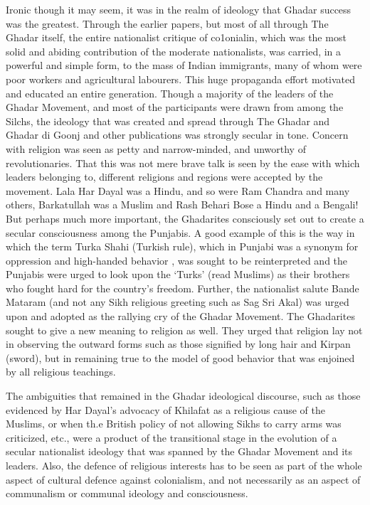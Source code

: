 Ironic though it may seem, it was in the realm of ideology that Ghadar success was the greatest. Through the earlier papers, but most of all through The Ghadar itself, the entire nationalist critique of co1onialin, which was the most solid and abiding contribution of the moderate nationalists, was carried, in a powerful and simple form, to the mass of Indian immigrants, many of whom were poor workers and agricultural labourers. This huge propaganda effort motivated and educated an entire generation. Though a majority of the leaders of the Ghadar Movement, and most of the participants were drawn from among the Silchs, the ideology that was created and spread through The Ghadar and Ghadar di Goonj and other publications was strongly secular in tone. Concern with religion was seen as petty and narrow-minded, and unworthy of revolutionaries. That this was not mere brave talk is seen by the ease with which leaders belonging to, different religions and regions were accepted by the movement. Lala Har Dayal was a Hindu, and so were Ram Chandra and many others, Barkatullah was a Muslim and Rash Behari Bose a Hindu and a Bengali! But perhaps much more important, the Ghadarites consciously set out to create a secular consciousness among the Punjabis. A good example of this is the way in which the term Turka Shahi (Turkish rule), which in Punjabi was a synonym for oppression and high-handed behavior , was sought to be reinterpreted and the Punjabis were urged to look upon the `Turks' (read Muslims) as their brothers who fought hard for the country's freedom. Further, the nationalist salute Bande Mataram (and not any Sikh religious greeting such as Sag Sri Akal) was urged upon and adopted as the rallying cry of the Ghadar Movement. The Ghadarites sought to give a new meaning to religion as well. They urged that religion lay not in observing the outward forms such as those signified by long hair and Kirpan (sword), but in remaining true to the model of good behavior that was enjoined by all religious teachings.

The ambiguities that remained in the Ghadar ideological discourse, such as those evidenced by Har Dayal's advocacy of Khilafat as a religious cause of the Muslims, or when th.e British policy of not allowing Sikhs to carry arms was criticized, etc., were a product of the transitional stage in the evolution of a secular nationalist ideology that was spanned by the Ghadar Movement and its leaders. Also, the defence of religious interests has to be seen as part of the whole aspect of cultural defence against colonialism, and not necessarily as an aspect of communalism or communal ideology and consciousness.

